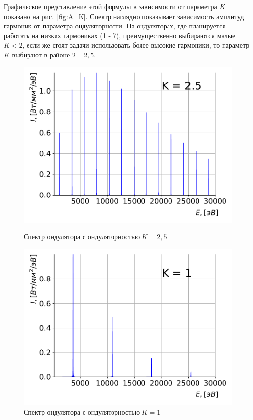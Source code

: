 Графическое представление этой формулы в зависимости от параметра $K$ показано на рис.~\ref{fig:A_K}. Спектр наглядно показывает зависимость амплитуд гармоник от параметра ондуляторности. На ондуляторах, где планируется работать на низких гармониках (1 - 7), преимущественно выбираются малые $K < 2$, если же стоят задачи использовать более высокие гармоники, то параметр $K$ выбирают в районе $2 - 2,5$.
\begin{figure}[h!]
	\begin{minipage}{0.49\textwidth}
		\centering
		\includegraphics[width=\textwidth]{pic/spec_und_1-1.pdf}
		\caption{Спектр ондулятора с ондуляторностью $K = 2,5$}
		\label{fig:spec_und_1-1}
	\end{minipage}
	\begin{minipage}{0.49\textwidth}
		\centering
		\includegraphics[width=\textwidth]{pic/spec_und_1-2.pdf}
		\caption{Спектр ондулятора с ондуляторностью $K = 1$}
		\label{fig:spec_und_1-2}
	\end{minipage}    
\end{figure}

